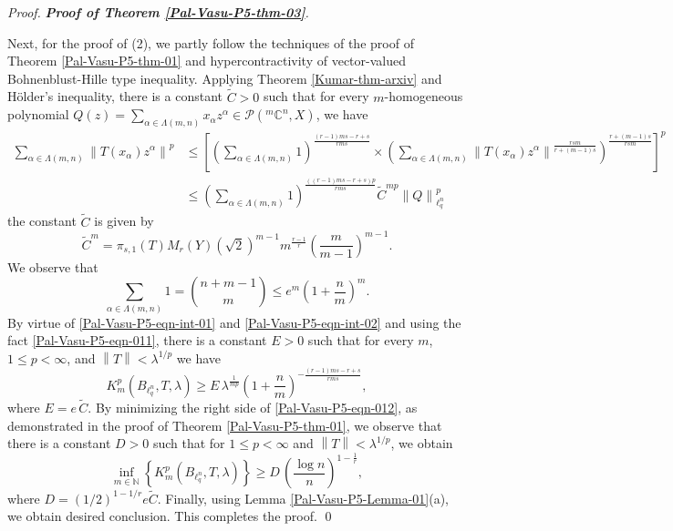 \documentclass[a4paper,12pt]{amsart}
\theoremstyle{definition}
\newenvironment{pf}[1][]{%
 \vskip 3mm
 \noindent
 \ifthenelse{\equal{#1}{}}%
  {{\slshape Proof. }}%
  {{\slshape #1.} }%
 }%
{\qed\bigskip}
\newcommand{\norm}[1]{\left\lVert#1\right\rVert}
\begin{document}
\begin{pf}[{\bf Proof of Theorem \ref{Pal-Vasu-P5-thm-03}}]
Next, for the proof of (2), we partly follow the techniques of the proof of Theorem \ref{Pal-Vasu-P5-thm-01} and hypercontractivity of vector-valued  Bohnenblust-Hille type inequality. Applying Theorem \ref{Kumar-thm-arxiv} and H\"{o}lder's inequality, there is a constant $\widetilde{C}>0$ such that for every $m$-homogeneous polynomial $Q(z)=\sum_{\alpha \in\Lambda(m,n)}x_{\alpha}z^{\alpha}\in \mathcal{P}(^m\mathbb{C}^n, X)$, we have
 \begin{align*}\label{Pal-Vasu-P5-eqn-010}
 	\sum_{\alpha \in\Lambda(m,n)}\norm{T(x_{\alpha})z^{\alpha}}^p  &\leq  \left[\left(\sum_{\alpha \in\Lambda(m,n)}1\right)^{\frac{(r-1)ms-r+s}{rms}}\times \left(\sum_{\alpha \in\Lambda(m,n)}\norm{T(x_{\alpha})z^{\alpha}}^{\frac{rsm}{r+(m-1)s}}\right)^{\frac{r+(m-1)s}{rsm}}\right]^p\\[2mm] &
 	\leq \left(\sum_{\alpha \in\Lambda(m,n)}1\right)^{\frac{((r-1)ms-r+s)p}{rms}} \widetilde{C}^{mp} \norm{Q}^p_{\ell^n_q}
 \end{align*}
the constant $\widetilde{C}$ is given by 
\begin{equation*}
	\widetilde{C}^m=\pi_{s,1}(T)M_{r}(Y)(\sqrt{2})^{m-1}m^{\frac{r-1}{r}}\left(\frac{m}{m-1}\right)^{m-1}.
\end{equation*}
We observe that
\begin{equation}\label{Pal-Vasu-P5-eqn-011}
\sum_{\alpha \in\Lambda(m,n)}1=\binom{n+m-1}{m}\leq e^m\left(1+\frac{n}{m}\right)^m.
\end{equation}
By virtue of \eqref{Pal-Vasu-P5-eqn-int-01} and \eqref{Pal-Vasu-P5-eqn-int-02} and using the fact \eqref{Pal-Vasu-P5-eqn-011}, there is a constant $E>0$ such that for every $m$, $1\leq p<\infty$, and $\norm{T}<\lambda^{1/p}$ we have
\begin{equation}\label{Pal-Vasu-P5-eqn-012}
	K^p_m(B_{\ell^n_q},T,\lambda)\geq E\, \lambda^{\frac{1}{mp}}\left(1+\frac{n}{m}\right)^{-\frac{(r-1)ms-r+s}{rms}},
\end{equation}
where $E=e\,\widetilde{C}$. By minimizing the right side of \eqref{Pal-Vasu-P5-eqn-012}, as demonstrated in the proof of Theorem \ref{Pal-Vasu-P5-thm-01}, we observe that there is a constant $D>0$ such that for $1\leq p<\infty$ and $\norm{T}<\lambda^{1/p}$, we obtain
\begin{equation*}
	\inf_{m\in \mathbb{N}} \left\{K^p_m(B_{\ell^n_q},T,\lambda)\right\}\geq D\, \left(\frac{\log n}{n}\right)^{1-\frac{1}{r}},
\end{equation*}
where $D=(1/2)^{1-1/r}e\widetilde{C}$.
Finally, using Lemma \ref{Pal-Vasu-P5-Lemma-01}(a), we obtain desired conclusion. This completes the proof.
\end{pf}
\end{document}
